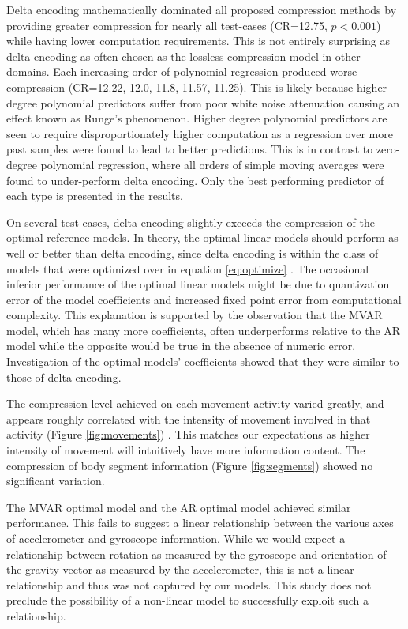\documentclass[journal]{IEEEtran}
\begin{document}
Delta encoding mathematically dominated all proposed compression methods by providing greater compression for nearly all test-cases (CR=12.75, $p<0.001$) while having lower computation requirements. This is not entirely surprising as delta encoding as often chosen as the lossless compression model in other domains\cite{Blalock2018}\cite{Coalson2008}. Each increasing order of polynomial regression produced worse compression (CR=12.22, 12.0, 11.8, 11.57, 11.25). This is likely because higher degree polynomial predictors suffer from poor white noise attenuation \cite{Tanskanen2000} causing an effect known as Runge's phenomenon. Higher degree polynomial predictors are seen to require disproportionately higher computation as a regression over more past samples were found to lead to better predictions. This is in contrast to zero-degree polynomial regression, where all orders of simple moving averages were found to under-perform delta encoding. Only the best performing predictor of each type is presented in the results.

On several test cases, delta encoding slightly exceeds the compression of the optimal reference models. In theory, the optimal linear models should perform as well or better than delta encoding, since delta encoding is within the class of models that were optimized over in equation \eqref{eq:optimize} . The occasional inferior performance of the optimal linear models might be due to quantization error of the model coefficients and increased fixed point error from computational complexity. This explanation is supported by the observation that the MVAR model, which has many more coefficients, often underperforms relative to the AR model while the opposite would be true in the absence of numeric error. Investigation of the optimal models' coefficients showed that they were similar to those of delta encoding.

The compression level achieved on each movement activity varied greatly, and appears roughly correlated with the intensity of movement involved in that activity (Figure \ref{fig:movements}) . This matches our expectations as higher intensity of movement will intuitively have more information content. The compression of body segment information (Figure \ref{fig:segments}) showed no significant variation.

The MVAR optimal model and the AR optimal model achieved similar performance. This fails to suggest a linear relationship between the various axes of accelerometer and gyroscope information. While we would expect a relationship between rotation as measured by the gyroscope and orientation of the gravity vector as measured by the accelerometer, this is not a linear relationship and thus was not captured by our models. This study does not preclude the possibility of a non-linear model to successfully exploit such a relationship.
\end{document}
